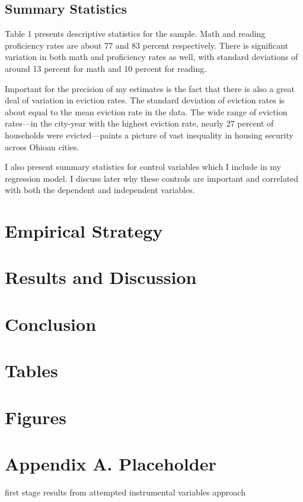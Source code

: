 \documentclass[12pt]{article}
\begin{document}
\subsection{Summary Statistics}
Table 1 presents descriptive statistics for the sample. Math and reading proficiency rates are about 77 and 83 percent respectively. There is significant variation in both math and proficiency rates as well, with standard deviations of around 13 percent for math and 10 percent for reading.

Important for the precision of my estimates is the fact that there is also a great deal of variation in eviction rates. The standard deviation of eviction rates is about equal to the mean eviction rate in the data. The wide range of  eviction rates—in the city-year with the highest eviction rate, nearly 27 percent of households were evicted—paints a picture of vast inequality in housing security across Ohioan cities.

I also present summary statistics for control variables which I include in my regression model. I discuss later why these controls are important and correlated with both the dependent and independent variables.



\section{Empirical Strategy} \label{sec:empirical_strategy}

\section{Results and Discussion} \label{sec:result}

\section{Conclusion} \label{sec:conclusion}



\singlespacing
\setlength\bibsep{0pt}





\clearpage

\onehalfspacing

\section*{Tables} \label{sec:tab}






\clearpage

\section*{Figures} \label{sec:fig}



\clearpage

\section*{Appendix A. Placeholder} \label{sec:appendixa}
first stage results from attempted instrumental variables approach
\end{document}
